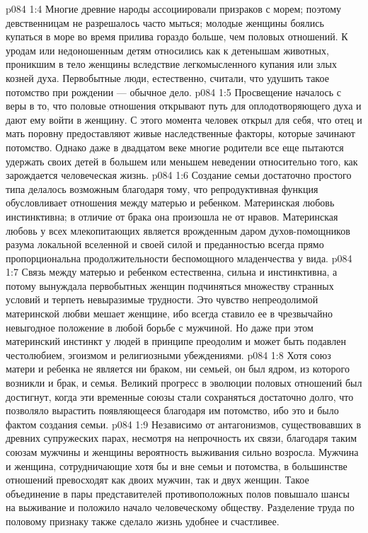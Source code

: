 \vs p084 1:4 Многие древние народы ассоциировали призраков с морем; поэтому девственницам не разрешалось часто мыться; молодые женщины боялись купаться в море во время прилива гораздо больше, чем половых отношений. К уродам или недоношенным детям относились как к детенышам животных, проникшим в тело женщины вследствие легкомысленного купания или злых козней духа. Первобытные люди, естественно, считали, что удушить такое потомство при рождении --- обычное дело.
\vs p084 1:5 Просвещение началось с веры в то, что половые отношения открывают путь для оплодотворяющего духа и дают ему войти в женщину. С этого момента человек открыл для себя, что отец и мать поровну предоставляют живые наследственные факторы, которые зачинают потомство. Однако даже в двадцатом веке многие родители все еще пытаются удержать своих детей в большем или меньшем неведении относительно того, как зарождается человеческая жизнь.
\vs p084 1:6 \pc Создание семьи достаточно простого типа делалось возможным благодаря тому, что репродуктивная функция обусловливает отношения между матерью и ребенком. Материнская любовь инстинктивна; в отличие от брака она произошла не от нравов. Материнская любовь у всех млекопитающих является врожденным даром духов\hyp{}помощников разума локальной вселенной и своей силой и преданностью всегда прямо пропорциональна продолжительности беспомощного младенчества у вида.
\vs p084 1:7 Связь между матерью и ребенком естественна, сильна и инстинктивна, а потому вынуждала первобытных женщин подчиняться множеству странных условий и терпеть невыразимые трудности. Это чувство непреодолимой материнской любви мешает женщине, ибо всегда ставило ее в чрезвычайно невыгодное положение в любой борьбе с мужчиной. Но даже при этом материнский инстинкт у людей в принципе преодолим и может быть подавлен честолюбием, эгоизмом и религиозными убеждениями.
\vs p084 1:8 Хотя союз матери и ребенка не является ни браком, ни семьей, он был ядром, из которого возникли и брак, и семья. Великий прогресс в эволюции половых отношений был достигнут, когда эти временные союзы стали сохраняться достаточно долго, что позволяло вырастить появляющееся благодаря им потомство, ибо это и было фактом создания семьи.
\vs p084 1:9 Независимо от антагонизмов, существовавших в древних супружеских парах, несмотря на непрочность их связи, благодаря таким союзам мужчины и женщины вероятность выживания сильно возросла. Мужчина и женщина, сотрудничающие хотя бы и вне семьи и потомства, в большинстве отношений превосходят как двоих мужчин, так и двух женщин. Такое объединение в пары представителей противоположных полов повышало шансы на выживание и положило начало человеческому обществу. Разделение труда по половому признаку также сделало жизнь удобнее и счастливее.
